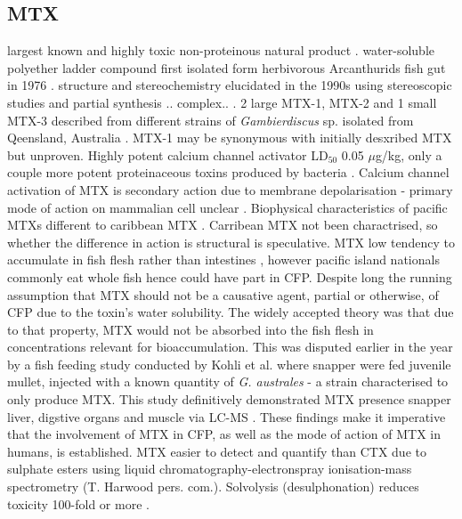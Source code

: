 \documentclass[12pt]{article}
\begin{document}
\subsection{MTX}
largest known and highly toxic non-proteinous natural product \cite{yokoyama1988some,murata1993structure}. water-soluble polyether ladder compound first isolated form herbivorous Arcanthurids fish gut in 1976 \cite{yasumoto1976toxicity}. structure and stereochemistry elucidated in the 1990s using stereoscopic studies and partial synthesis .. complex.. \cite{murata1993structure,murata1994structure,satake1995structural,nonomura1996complete,zheng1996complete}.
2 large MTX-1, MTX-2 and 1 small MTX-3 described from different strains of \emph{Gambierdiscus} sp. isolated from Qeensland, Australia \cite{holmes1994purification}. MTX-1 may be synonymous with initially desxribed MTX but unproven. Highly potent calcium channel activator LD$_{50}$ 0.05 $\mu$g/kg, only a couple more potent proteinaceous toxins produced by bacteria \cite{yokoyama1988some,murata1993structure}.
Calcium channel activation of MTX is secondary action due to membrane depolarisation - primary mode of action on mammalian cell unclear \cite{van2000diversity}.
Biophysical characteristics of pacific MTXs different to caribbean MTX \cite{lu2013caribbean}. Carribean MTX not been charactrised, so whether the difference in action is structural is speculative. %
MTX low tendency to accumulate in fish flesh rather than intestines \cite{yasumoto1976toxicity}, however pacific island nationals commonly eat whole fish hence could have part in CFP. Despite long the running assumption that MTX should not be a causative agent, partial or otherwise, of CFP due to the toxin's water solubility. The widely accepted theory was that due to that property, MTX would not be absorbed into the fish flesh in concentrations relevant for bioaccumulation. This was disputed earlier in the year by a fish feeding study conducted by Kohli et al. where snapper were fed juvenile mullet, injected with a known quantity of \emph{G. australes} - a strain characterised to only produce MTX. This study definitively demonstrated MTX presence snapper liver, digstive organs and muscle via LC-MS \cite{kohli2014feeding}. These findings make it imperative that the involvement of MTX in CFP, as well as the mode of action of MTX in humans, is established.   %
MTX easier to detect and quantify than CTX due to sulphate esters using liquid chromatography-electronspray ionisation-mass spectrometry (T. Harwood pers. com.). Solvolysis (desulphonation) reduces toxicity 100-fold or more \cite{murata1991effect}.
\end{document}
